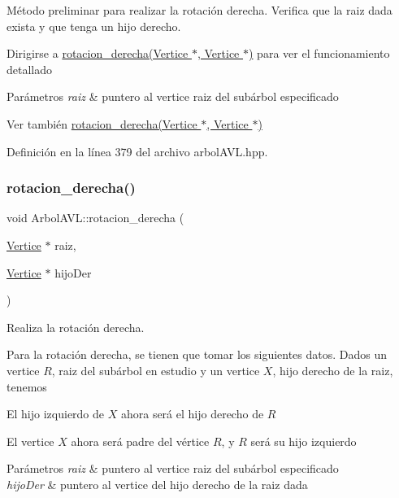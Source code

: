 Método preliminar para realizar la rotación derecha. Verifica que la raiz dada exista y que tenga un hijo derecho. 

Dirigirse a \hyperlink{classArbolAVL_a33dfba0b6e53caa0f2e4b71a8d2c6a7e}{rotacion\+\_\+derecha(\+Vertice $\ast$, Vertice $\ast$)} para ver el funcionamiento detallado 
\begin{DoxyParams}{Parámetros}
{\em raiz} & puntero al vertice raiz del subárbol especificado \\
\hline
\end{DoxyParams}
\begin{DoxySeeAlso}{Ver también}
\hyperlink{classArbolAVL_a33dfba0b6e53caa0f2e4b71a8d2c6a7e}{rotacion\+\_\+derecha(\+Vertice $\ast$, Vertice $\ast$)} 
\end{DoxySeeAlso}


Definición en la línea 379 del archivo arbol\+A\+V\+L.\+hpp.

\mbox{\label{classArbolAVL_a33dfba0b6e53caa0f2e4b71a8d2c6a7e}} 
\subsubsection{\texorpdfstring{rotacion\+\_\+derecha()}{rotacion\_derecha()}\hspace{0.1cm}{\footnotesize\ttfamily [2/2]}}
{\footnotesize\ttfamily void Arbol\+A\+V\+L\+::rotacion\+\_\+derecha (\begin{DoxyParamCaption}\item[{\hyperlink{classVertice}{Vertice} $\ast$}]{raiz,  }\item[{\hyperlink{classVertice}{Vertice} $\ast$}]{hijo\+Der }\end{DoxyParamCaption})}



Realiza la rotación derecha. 

Para la rotación derecha, se tienen que tomar los siguientes datos. Dados un vertice $R$, raiz del subárbol en estudio y un vertice $X$, hijo derecho de la raiz, tenemos
\begin{DoxyItemize}
\item El hijo izquierdo de $X$ ahora será el hijo derecho de $R$
\item El vertice $X$ ahora será padre del vértice $R$, y $R$ será su hijo izquierdo ~\newline
  
\begin{DoxyParams}{Parámetros}
{\em raiz} & puntero al vertice raiz del subárbol especificado \\
\hline
{\em hijo\+Der} & puntero al vertice del hijo derecho de la raiz dada \\
\hline
\end{DoxyParams}

\end{DoxyItemize}

